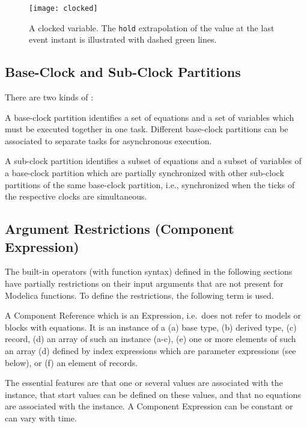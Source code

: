 \begin{figure}[H]
  \begin{center}
    \texttt{[image: clocked]}
  \end{center}
  \caption{A clocked variable.  The \lstinline!hold! extrapolation of the value at the last event instant is illustrated with dashed green lines.}\label{fig:clocked-variable}
\end{figure}

\subsection{Base-Clock and Sub-Clock Partitions}\label{base-clock-and-sub-clock-partitions}

There are two kinds of :

\begin{definition}
A base-clock partition identifies a set of equations and a set of variables which must be executed together in one task.  Different base-clock partitions can be associated to separate tasks for
asynchronous execution.
\end{definition}

\begin{definition}
A sub-clock partition identifies a subset of equations and a subset of variables of a base-clock partition which are partially synchronized with other sub-clock partitions of the same base-clock
partition, i.e., synchronized when the ticks of the respective clocks are simultaneous.
\end{definition}

\subsection{Argument Restrictions (Component Expression)}\label{argument-restrictions-component-expression}

The built-in operators (with function syntax) defined in the following
sections have partially restrictions on their input arguments that are
not present for Modelica functions. To define the restrictions, the
following term is used.

\begin{definition}\label{def:component-expression}
A Component Reference which is an Expression, i.e.\ does not refer to models or blocks with equations.  It is an instance of a (a) base type, (b) derived type, (c) record, (d) an array of such an
instance (a-c), (e) one or more elements of such an array (d) defined by index expressions which are parameter expressions (see below), or (f) an element of records.
\begin{nonnormative}
The essential features are that one or several values are associated with the instance, that start values can be defined on these values, and that no equations are associated with the instance.
A Component Expression can be constant or can vary with time.
\end{nonnormative}
\end{definition}

